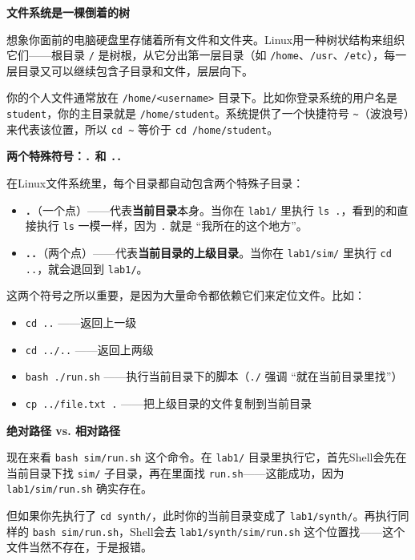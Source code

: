 \documentclass[11pt,a4paper]{article}
\begin{document}
\textbf{文件系统是一棵倒着的树}

想象你面前的电脑硬盘里存储着所有文件和文件夹。Linux用一种树状结构来组织它们——根目录 \texttt{/} 是树根，从它分出第一层目录（如 \texttt{/home}、\texttt{/usr}、\texttt{/etc}），每一层目录又可以继续包含子目录和文件，层层向下。

你的个人文件通常放在 \texttt{/home/<username>} 目录下。比如你登录系统的用户名是 \texttt{student}，你的主目录就是 \texttt{/home/student}。系统提供了一个快捷符号 \texttt{\textasciitilde}（波浪号）来代表该位置，所以 \texttt{cd \textasciitilde} 等价于 \texttt{cd /home/student}。

\textbf{两个特殊符号：\texttt{.} 和 \texttt{..}}

在Linux文件系统里，每个目录都自动包含两个特殊子目录：

\begin{itemize}
  \item \textbf{\texttt{.}}（一个点）——代表\textbf{当前目录}本身。当你在 \texttt{lab1/} 里执行 \texttt{ls .}，看到的和直接执行 \texttt{ls} 一模一样，因为 \texttt{.} 就是 ``我所在的这个地方''。
  \item \textbf{\texttt{..}}（两个点）——代表\textbf{当前目录的上级目录}。当你在 \texttt{lab1/sim/} 里执行 \texttt{cd ..}，就会退回到 \texttt{lab1/}。
\end{itemize}

这两个符号之所以重要，是因为大量命令都依赖它们来定位文件。比如：

\begin{itemize}
  \item \texttt{cd ..} ——返回上一级
  \item \texttt{cd ../..} ——返回上两级
  \item \texttt{bash ./run.sh} ——执行当前目录下的脚本（\texttt{./} 强调 ``就在当前目录里找''）
  \item \texttt{cp ../file.txt .} ——把上级目录的文件复制到当前目录
\end{itemize}

\textbf{绝对路径 vs. 相对路径}

现在来看 \texttt{bash sim/run.sh} 这个命令。在 \texttt{lab1/} 目录里执行它，首先Shell会先在当前目录下找 \texttt{sim/} 子目录，再在里面找 \texttt{run.sh}——这能成功，因为 \texttt{lab1/sim/run.sh} 确实存在。

但如果你先执行了 \texttt{cd synth/}，此时你的当前目录变成了 \texttt{lab1/synth/}。再执行同样的 \texttt{bash sim/run.sh}，Shell会去 \texttt{lab1/synth/sim/run.sh} 这个位置找——这个文件当然不存在，于是报错。
\end{document}
